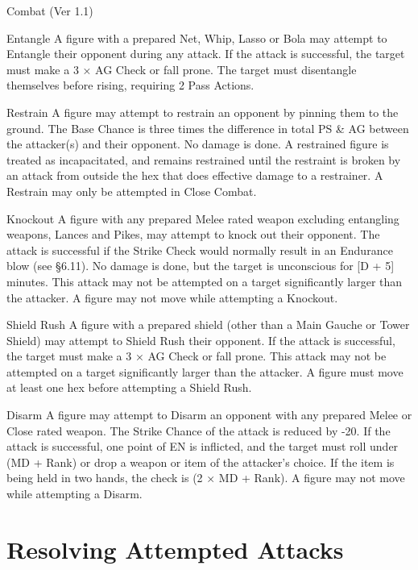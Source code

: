 \begin{Chapter}{Combat (Ver 1.1)}
\begin{Description}
\item[Entangle] A figure with a prepared Net, Whip, Lasso or Bola may
  attempt to Entangle their opponent during any attack.  If the attack
  is successful, the target must make a 3 × AG Check or fall prone.
  The target must disentangle themselves before rising, requiring 2
  Pass Actions.

\item[Restrain] A figure may attempt to restrain an opponent by
  pinning them to the ground.  The Base Chance is three times the
  difference in total PS \& AG between the attacker(s) and their
  opponent. No damage is done.  A restrained figure is treated as
  incapacitated, and remains restrained until the restraint is broken
  by an attack from outside the hex that does effective damage to a
  restrainer.  A Restrain may only be attempted in Close Combat.

\item[Knockout] A figure with any prepared Melee rated weapon
  excluding entangling weapons, Lances and Pikes, may attempt to knock
  out their opponent.  The attack is successful if the Strike Check
  would normally result in an Endurance blow (see §6.11).  No damage
  is done, but the target is unconscious for [D + 5] minutes.  This
  attack may not be attempted on a target significantly larger than
  the attacker.  A figure may not move while attempting a Knockout.

\item[Shield Rush] A figure with a prepared shield (other than a Main
  Gauche or Tower Shield) may attempt to Shield Rush their
  opponent. If the attack is successful, the target must make a 3 × AG
  Check or fall prone.  This attack may not be attempted on a target
  significantly larger than the attacker.  A figure must move at least
  one hex before attempting a Shield Rush.

\item[Disarm] A figure may attempt to Disarm an opponent with any
  prepared Melee or Close rated weapon. The Strike Chance of the
  attack is reduced by -20. If the attack is successful, one point of
  EN is inflicted, and the target must roll under (MD + Rank) or drop
  a weapon or item of the attacker’s choice.  If the item is being
  held in two hands, the check is (2 × MD + Rank). A figure may not
  move while attempting a Disarm.

\end{Description}

\section{Resolving Attempted Attacks}


\end{Chapter}
